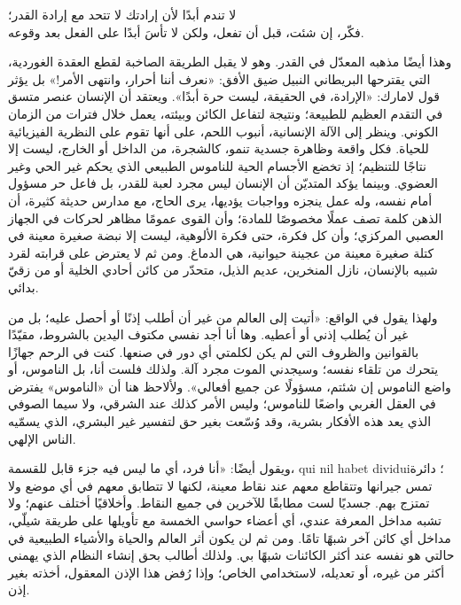 \begin{SourceQuotation}
لا تندم أبدًا لأن إرادتك لا تتحد مع إرادة القدر؛\\
فكّر، إن شئت، قبل أن تفعل، ولكن لا تأسَ أبدًا على الفعل بعد وقوعه.
\end{SourceQuotation}

وهذا أيضًا مذهبه المعدّل في القدر. وهو لا يقبل الطريقة الصاخبة لقطع العقدة الغوردية، التي يقترحها البريطاني النبيل ضيق الأفق: «نعرف أننا أحرار، وانتهى الأمر!» بل يؤثر قول لامارك: «الإرادة، في الحقيقة، ليست حرة أبدًا». ويعتقد أن الإنسان عنصر متسق في التقدم العظيم للطبيعة؛ ونتيجة لتفاعل الكائن وبيئته، يعمل خلال فترات من الزمان الكوني. وينظر إلى الآلة الإنسانية، أنبوب اللحم، على أنها تقوم على النظرية الفيزيائية للحياة. فكل واقعة وظاهرة جسدية تنمو، كالشجرة، من الداخل أو الخارج، ليست إلا نتاجًا للتنظيم؛ إذ تخضع الأجسام الحية للناموس الطبيعي الذي يحكم غير الحي وغير العضوي. وبينما يؤكد المتديّن أن الإنسان ليس مجرد لعبة للقدر، بل فاعل حر مسؤول أمام نفسه، وله عمل ينجزه وواجبات يؤديها، يرى الحاج، مع مدارس حديثة كثيرة، أن الذهن كلمة تصف عملًا مخصوصًا للمادة؛ وأن القوى عمومًا مظاهر لحركات في الجهاز العصبي المركزي؛ وأن كل فكرة، حتى فكرة الألوهية، ليست إلا نبضة صغيرة معينة في كتلة صغيرة معينة من عجينة حيوانية، هي الدماغ. ومن ثم لا يعترض على قرابته لقرد شبيه بالإنسان، نازل المنخرين، عديم الذيل، متحدّر من كائن أحادي الخلية أو من زقيّ بدائي.

ولهذا يقول في الواقع: «أتيت إلى العالم من غير أن أطلب إذنًا أو أحصل عليه؛ بل من غير أن يُطلب إذني أو أعطيه. وها أنا أجد نفسي مكتوف اليدين بالشروط، مقيّدًا بالقوانين والظروف التي لم يكن لكلمتي أي دور في صنعها. كنت في الرحم جهازًا يتحرك من تلقاء نفسه؛ وسيجدني الموت مجرد آلة. ولذلك فلست أنا، بل الناموس، أو واضع الناموس إن شئتم، مسؤولًا عن جميع أفعالي». ولألاحظ هنا أن «الناموس» يفترض في العقل الغربي واضعًا للناموس؛ وليس الأمر كذلك عند الشرقي، ولا سيما الصوفي الذي يعد هذه الأفكار بشرية، وقد وُسّعت بغير حق لتفسير غير البشري، الذي يسمّيه الناس الإلهي.

ويقول أيضًا: «أنا فرد، أي ما ليس فيه جزء قابل للقسمة، \textenglish{qui nil habet dividui}؛ دائرة تمس جيرانها وتتقاطع معهم عند نقاط معينة، لكنها لا تتطابق معهم في أي موضع ولا تمتزج بهم. جسديًا لست مطابقًا للآخرين في جميع النقاط. وأخلاقيًا أختلف عنهم؛ ولا تشبه مداخل المعرفة عندي، أي أعضاء حواسي الخمسة مع تأويلها على طريقة شيلّي، مداخل أي كائن آخر شبهًا تامًا. ومن ثم لن يكون أثر العالم والحياة والأشياء الطبيعية في حالتي هو نفسه عند أكثر الكائنات شبهًا بي. ولذلك أطالب بحق إنشاء النظام الذي يهمني أكثر من غيره، أو تعديله، لاستخدامي الخاص؛ وإذا رُفض هذا الإذن المعقول، أخذته بغير إذن.

